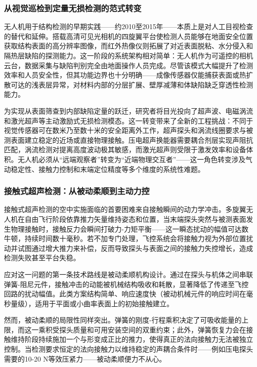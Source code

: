 \subsubsection{从视觉巡检到定量无损检测的范式转变}

无人机用于结构检测的早期实践——约2010至2015年——本质上是对人工目视检查的替代和延伸。搭载高清可见光相机的四旋翼平台使检测人员能够在地面安全位置获取结构表面的高分辨率图像，而红外热像仪则拓展了对近表面脱粘、水分侵入和隔热层缺陷的探测能力。这一阶段的系统架构相对简单：无人机作为可遥控的相机云台，数据采集与缺陷判别完全由地面操作人员完成。尽管该模式大幅提升了检测效率和人员安全性，但其功能边界也十分明确——成像传感器仅能捕获表面或热扩散可达的浅表层异常，对材料内部的分层扩展、壁厚减薄和体缺陷缺乏穿透性检测能力。

为实现从表面筛查到内部缺陷定量的跃迁，研究者将目光投向了超声波、电磁涡流和激光超声等主动激励式无损检测模态。这一转变带来了全新的工程挑战：不同于视觉传感器可在数米乃至数十米的安全距离外工作，超声探头和涡流线圈要求与被测表面建立稳定的近场或直接物理接触。压电超声换能器需要耦合剂层实现声阻抗匹配，涡流检测对提离高度波动极其敏感，而激光超声则受限于激发效率和设备体积。无人机必须从“远端观察者”转变为“近端物理交互者”——这一角色转变涉及气动稳定性、接触力控制和末端定位精度等多个维度的系统性难题。

\subsubsection{接触式超声检测：从被动柔顺到主动力控}

接触式超声检测的空中实施面临的首要困难来自接触瞬间的动力学冲击。多旋翼无人机在自由飞行阶段依靠推力矢量维持姿态和位置，当末端探头突然与被测表面发生物理接触时，接触反力会瞬间打破力-力矩平衡——这一瞬态扰动的幅值可达数牛顿，持续时间数十毫秒。若不加专门处理，飞控系统会将接触力视为外部位置扰动并试图通过增大推力来补偿，反而导致探头与表面之间的接触力失控增长，造成检测失败甚至平台失稳。

应对这一问题的第一条技术路线是被动柔顺机构设计。通过在探头与机体之间串联弹簧-阻尼元件，接触冲击的动能被机械结构吸收和耗散，显著降低了传递至飞控回路的扰动幅值。此类方案结构简单、响应速度快（被动机械元件的响应时间在毫秒量级），适用于平面或小曲率表面上的初始接触建立。

然而，被动柔顺的局限性同样突出。弹簧的刚度-行程乘积决定了可吸收能量的上限，而这一乘积受探头质量和可用安装空间的双重约束；此外，弹簧恢复力会在接触维持阶段持续施加一个与形变成正比的推力，使得真正的法向接触力无法被独立控制。当检测要求恒定的法向接触力以维持稳定的声耦合条件时——例如压电探头需要的10-20 N等效压紧力——被动柔顺便力不从心。

